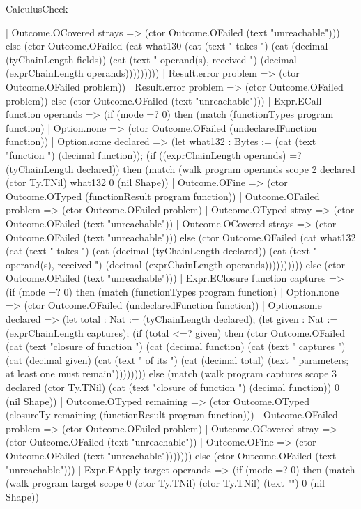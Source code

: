 \begin{lexlean}{CalculusCheck}
\begin{semanticmodule}
{          | Outcome.OCovered strays => (ctor Outcome.OFailed (text "unreachable"))) else (ctor Outcome.OFailed (cat what130 (cat (text " takes ") (cat (decimal (tyChainLength fields)) (cat (text " operand(s), received ") (decimal (exprChainLength operands)))))))))
        | Result.error problem => (ctor Outcome.OFailed problem))
      | Result.error problem => (ctor Outcome.OFailed problem)) else (ctor Outcome.OFailed (text "unreachable")))
    | Expr.ECall function operands => (if (mode =? 0) then (match (functionTypes program function)
      | Option.none => (ctor Outcome.OFailed (undeclaredFunction function))
      | Option.some declared => (let what132 : Bytes := (cat (text "function ") (decimal function)); (if ((exprChainLength operands) =? (tyChainLength declared)) then (match (walk program operands scope 2 declared (ctor Ty.TNil) what132 0 (nil Shape))
        | Outcome.OFine => (ctor Outcome.OTyped (functionResult program function))
        | Outcome.OFailed problem => (ctor Outcome.OFailed problem)
        | Outcome.OTyped stray => (ctor Outcome.OFailed (text "unreachable"))
        | Outcome.OCovered strays => (ctor Outcome.OFailed (text "unreachable"))) else (ctor Outcome.OFailed (cat what132 (cat (text " takes ") (cat (decimal (tyChainLength declared)) (cat (text " operand(s), received ") (decimal (exprChainLength operands)))))))))) else (ctor Outcome.OFailed (text "unreachable")))
    | Expr.EClosure function captures => (if (mode =? 0) then (match (functionTypes program function)
      | Option.none => (ctor Outcome.OFailed (undeclaredFunction function))
      | Option.some declared => (let total : Nat := (tyChainLength declared); (let given : Nat := (exprChainLength captures); (if (total <=? given) then (ctor Outcome.OFailed (cat (text "closure of function ") (cat (decimal function) (cat (text " captures ") (cat (decimal given) (cat (text " of its ") (cat (decimal total) (text " parameters; at least one must remain")))))))) else (match (walk program captures scope 3 declared (ctor Ty.TNil) (cat (text "closure of function ") (decimal function)) 0 (nil Shape))
        | Outcome.OTyped remaining => (ctor Outcome.OTyped (closureTy remaining (functionResult program function)))
        | Outcome.OFailed problem => (ctor Outcome.OFailed problem)
        | Outcome.OCovered stray => (ctor Outcome.OFailed (text "unreachable"))
        | Outcome.OFine => (ctor Outcome.OFailed (text "unreachable"))))))) else (ctor Outcome.OFailed (text "unreachable")))
    | Expr.EApply target operands => (if (mode =? 0) then (match (walk program target scope 0 (ctor Ty.TNil) (ctor Ty.TNil) (text "") 0 (nil Shape))
}
\end{semanticmodule}
\end{lexlean}

